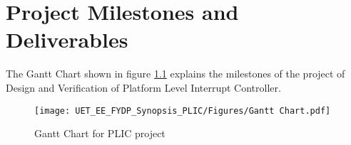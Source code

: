 
\chapter{Project Milestones and Deliverables}
\label{Chapter6}

The Gantt Chart shown in figure  \ref{fig:plic_ganttchart} explains the milestones of the project of Design and Verification of Platform Level Interrupt Controller.\\

\begin{figure}[h!]
  \centering
  \texttt{[image: UET\_EE\_FYDP\_Synopsis\_PLIC/Figures/Gantt Chart.pdf]}
  \caption{Gantt Chart for PLIC project}
  \label{fig:plic_ganttchart}
\end{figure}


